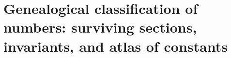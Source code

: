 \chapter{Genealogical classification of numbers: surviving sections, invariants, and atlas of constants}
\label{chap:p3-final:52:atlas_numero}



